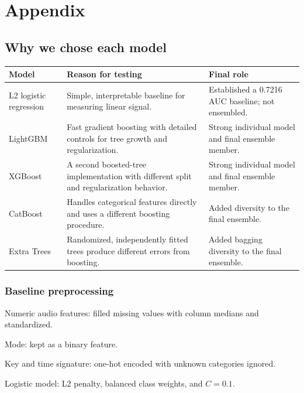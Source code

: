 \documentclass{article}
\begin{document}
\clearpage
\appendix
\section{Appendix}
\setcounter{secnumdepth}{2}

\subsection{Why we chose each model}
\label{app:models}
\begin{center}
\footnotesize
\setlength{\tabcolsep}{5pt}
\renewcommand{\arraystretch}{1.08}
\begin{tabularx}{0.97\textwidth}{@{}>{\raggedright\arraybackslash}p{}
  >{\raggedright\arraybackslash}p{}
  >{\raggedright\arraybackslash}X@{}}
\toprule
\textbf{Model} & \textbf{Reason for testing} & \textbf{Final role} \\
\midrule
L2 logistic regression & Simple, interpretable baseline for measuring linear
signal. & Established a 0.7216 AUC baseline; not ensembled. \\
LightGBM & Fast gradient boosting with detailed controls for tree growth and
regularization. & Strong individual model and final ensemble member. \\
XGBoost & A second boosted-tree implementation with different split and
regularization behavior. & Strong individual model and final ensemble member. \\
CatBoost & Handles categorical features directly and uses a different
boosting procedure. & Added diversity to the final ensemble. \\
Extra Trees & Randomized, independently fitted trees produce different errors
from boosting. & Added bagging diversity to the final ensemble. \\
\bottomrule
\end{tabularx}
\end{center}

\subsubsection{Baseline preprocessing}
\begin{compactitem}
  \item Numeric audio features: filled missing values with column medians and
  standardized.
  \item Mode: kept as a binary feature.
  \item Key and time signature: one-hot encoded with unknown categories
  ignored.
  \item Logistic model: L2 penalty, balanced class weights, and \(C=0.1\).
\end{compactitem}
\end{document}
